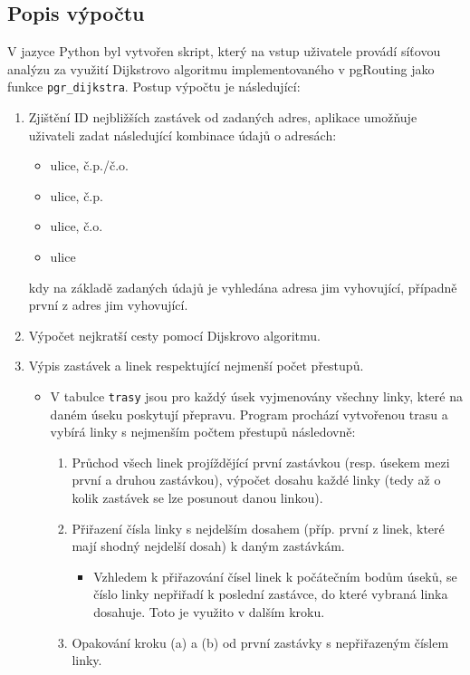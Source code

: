 \documentclass[a4paper, 12pt]{article}
\begin{document}
\subsection{Popis výpočtu}
V jazyce Python byl vytvořen skript, který na vstup uživatele provádí síťovou analýzu za využití Dijkstrovo algoritmu implementovaného v pgRouting jako funkce \texttt{pgr\_dijkstra}. Postup výpočtu je následující:
\begin{enumerate}
\item Zjištění ID nejbližších zastávek od zadaných adres, aplikace umožňuje uživateli zadat následující kombinace údajů o adresách:
	\begin{itemize}
		\item ulice, č.p./č.o.
		\item ulice, č.p.
		\item ulice, č.o.
		\item ulice
	\end{itemize}
	kdy na základě zadaných údajů je vyhledána adresa jim vyhovující, případně první z adres jim vyhovující.
\item Výpočet nejkratší cesty pomocí Dijskrovo algoritmu.
\item Výpis zastávek a linek respektující nejmenší počet přestupů.
	\begin{itemize}
		\item V tabulce \texttt{trasy} jsou pro každý úsek vyjmenovány všechny linky, které na daném úseku poskytují přepravu. Program prochází vytvořenou trasu a vybírá linky s nejmenším počtem přestupů následovně:
			\begin{enumerate}
				\item Průchod všech linek projíždějící první zastávkou (resp. úsekem mezi první a druhou zastávkou), výpočet dosahu každé linky (tedy až o kolik zastávek se lze posunout danou linkou).
				\item Přiřazení čísla linky s nejdelším dosahem (příp. první z linek, které mají shodný nejdelší dosah) k daným zastávkám.
						\begin{itemize}
							\item Vzhledem k přiřazování čísel linek k počátečním bodům  úseků, se číslo linky nepřiřadí k poslední zastávce, do které vybraná linka dosahuje. Toto je využito v dalším kroku.
						\end{itemize}
				\item Opakování kroku (a) a (b) od první zastávky s nepřiřazeným číslem linky.
			\end{enumerate}
	\end{itemize}
\end{enumerate} 
\end{document}
